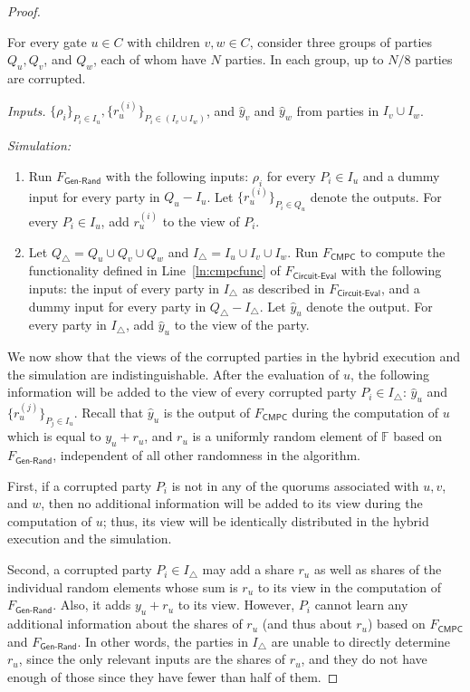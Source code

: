 \documentclass[11pt,letter]{article}
\newcommand{\func}[1]{\mbox{$F_\textsf{#1}$}}
\newcommand{\mask}[1]{\widehat{#1}}
\newcommand{\F}{\mathbb{F}}
\theoremstyle{mytheoremstyle}
\begin{document}
\begin{proof}
\begin{algorithm}
		For every gate $u \in C$ with children $v,w \in C$, consider three groups of parties $Q_u, Q_v$, and $Q_w$, each of whom have $N$ parties. In each group, up to $N/8$ parties are corrupted.\smallskip
		
		\textit{Inputs.} $\{\rho_i\}_{P_i \in I_u}, \{r_u^{(i)}\}_{P_i\in (I_v \cup I_w)}$, and $\mask{y}_v$ and $\mask{y}_w$ from parties in $I_v \cup I_w$. \medskip
		
		\textit{Simulation:}
		
		\begin{enumerate}
			\item Run \func{Gen-Rand} with the following inputs: $\rho_i$ for every $P_i \in I_u$ and a dummy input for every party in $Q_u - I_u$. Let $\{r_u^{(i)}\}_{P_i\in Q_u}$ denote the outputs. For every $P_i \in I_u$, add $r_u^{(i)}$ to the view of $P_i$.
			
			\item Let $Q_\triangle = Q_u \cup Q_v \cup Q_w$ and $I_\triangle = I_u \cup I_v \cup I_w$. Run \func{CMPC} to compute the functionality defined in Line~\ref{ln:cmpcfunc} of \func{Circuit-Eval} with the following inputs: the input of every party in $I_\triangle$ as described in \func{Circuit-Eval}, and a dummy input for every party in $Q_\triangle - I_\triangle$. Let $\mask{y}_u$ denote the output. For every party in $I_\triangle$, add $\mask{y}_u$ to the view of the party.
		\end{enumerate}
	\end{algorithm}
	
	We now show that the views of the corrupted parties in the hybrid execution and the simulation are indistinguishable.
After the evaluation of $u$, the following information will be added to the view of every corrupted party $P_i \in I_\triangle$: $\mask{y}_u$ and $\{r^{(j)}_u\}_{P_j \in I_u}$. Recall that $\mask{y}_u$ is the output of \func{CMPC} during the computation of $u$ which is equal to $y_u + r_u$, and $r_u$ is a uniformly random element of $\F$ based on \func{Gen-Rand}, independent of all other randomness in the algorithm.  	
	
	First, if a corrupted party $P_i$ is not in any of the quorums associated with $u,v$, and $w$, then no additional information will be added to its view during the computation of $u$; thus, its view will be identically distributed in the hybrid execution and the simulation.  
	
	Second, a corrupted party $P_i \in I_\triangle$ may add a share $r_u$ as well as shares of the individual random elements whose sum is $r_u$ to its view in the computation of \func{Gen-Rand}. Also, it adds $y_u+r_u$ to its view. However, $P_i$ cannot learn any additional information about the shares of $r_u$ (and thus about $r_u$) based on \func{CMPC} and \func{Gen-Rand}. In other words, the parties in $I_\triangle$ are unable to directly determine $r_u$, since the only relevant inputs are the shares of $r_u$, and they do not have enough of those since they have fewer than half of them. 
	

\end{proof}
\end{document}
